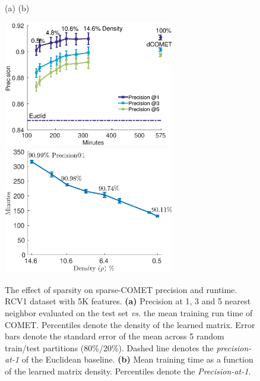 \documentclass[twoside,11pt]{article}
\begin{document}
\begin{figure}[t]
   \captionsetup{font=small}
    \caption{The effect of sparsity on sparse-COMET precision and runtime. RCV1 dataset with 5K features. \textbf{(a)} Precision at 1, 3 and 5 nearest neighbor evaluated on the test set {\em vs.} the mean training run time of COMET. Percentiles denote the density of the learned matrix. Error bars denote the standard error of the mean across 5 random train/test partitions (80\%/20\%). Dashed line denotes the \textit{precision-at-1} of the Euclidean baseline. \textbf{(b)} Mean training time as a function of the learned matrix density. Percentiles denote the \textit{Precision-at-1}. }\label{spCometPrecTime}
   {
  \centering
    \centerline{
    (a) \hspace{200pt} (b) \hspace{200pt} \newline{}
    }
   \includegraphics[width=7.5cm]{sCOMET_precision_vs_runtime}
   \includegraphics[width=7.5cm]{runtime_vs_density}
   }
   \vskip -4pt
\end{figure}
\end{document}

